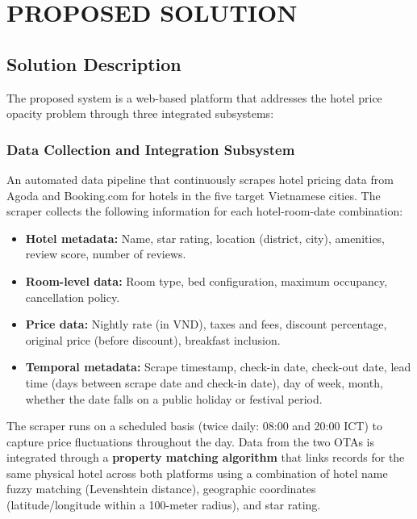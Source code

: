 \documentclass[12pt,a4paper]{report}
\begin{document}
\chapter{PROPOSED SOLUTION}

\section{Solution Description}

The proposed system is a web-based platform that addresses the hotel price opacity problem through three integrated subsystems:

\subsection{Data Collection and Integration Subsystem}

An automated data pipeline that continuously scrapes hotel pricing data from Agoda and Booking.com for hotels in the five target Vietnamese cities. The scraper collects the following information for each hotel-room-date combination:

\begin{itemize}
    \item \textbf{Hotel metadata:} Name, star rating, location (district, city), amenities, review score, number of reviews.
    \item \textbf{Room-level data:} Room type, bed configuration, maximum occupancy, cancellation policy.
    \item \textbf{Price data:} Nightly rate (in VND), taxes and fees, discount percentage, original price (before discount), breakfast inclusion.
    \item \textbf{Temporal metadata:} Scrape timestamp, check-in date, check-out date, lead time (days between scrape date and check-in date), day of week, month, whether the date falls on a public holiday or festival period.
\end{itemize}

The scraper runs on a scheduled basis (twice daily: 08:00 and 20:00 ICT) to capture price fluctuations throughout the day. Data from the two OTAs is integrated through a \textbf{property matching algorithm} that links records for the same physical hotel across both platforms using a combination of hotel name fuzzy matching (Levenshtein distance), geographic coordinates (latitude/longitude within a 100-meter radius), and star rating.
\end{document}
